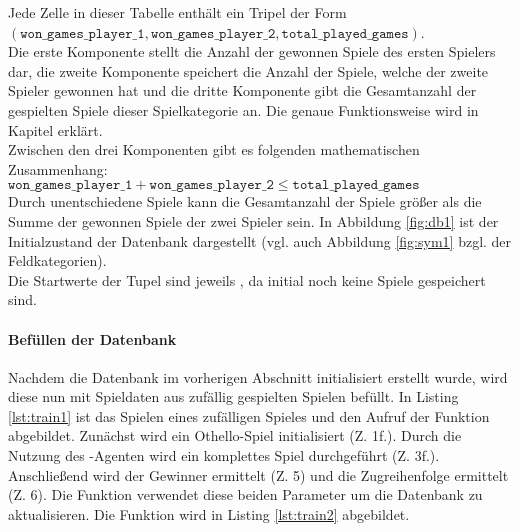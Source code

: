 Jede Zelle in dieser Tabelle enthält ein Tripel der Form \\$( \mathtt{won\_games\_player\_1}, \mathtt{won\_games\_player\_2}, \mathtt{total\_played\_games})$. 
\\Die erste Komponente stellt die Anzahl der gewonnen Spiele des ersten Spielers dar, die zweite Komponente speichert die Anzahl der Spiele, welche der zweite Spieler gewonnen hat und die dritte Komponente gibt die Gesamtanzahl der gespielten Spiele dieser Spielkategorie an. Die genaue Funktionsweise wird in Kapitel  erklärt.
\\Zwischen den drei Komponenten gibt es folgenden mathematischen Zusammenhang: 
\\$\mathtt{won\_games\_player\_1} + \mathtt{won\_games\_player\_2} \le \mathtt{total\_played\_games}$
\\Durch unentschiedene Spiele kann die Gesamtanzahl der Spiele größer als die Summe der gewonnen Spiele der zwei Spieler sein.
In Abbildung \ref{fig:db1} ist der Initialzustand der Datenbank dargestellt (vgl. auch Abbildung \ref{fig:sym1} bzgl. der Feldkategorien). 
\\
Die Startwerte der Tupel sind jeweils , da initial noch keine Spiele gespeichert sind.
\paragraph{Befüllen der Datenbank}
\label{para:train1}
Nachdem die Datenbank im vorherigen Abschnitt initialisiert erstellt wurde, wird diese nun mit Spieldaten aus zufällig gespielten Spielen befüllt. In Listing \ref{lst:train1} ist das Spielen eines zufälligen Spieles und den Aufruf der Funktion  abgebildet. Zunächst wird ein Othello-Spiel initialisiert (Z. 1f.). Durch die Nutzung des -Agenten wird ein komplettes Spiel durchgeführt (Z. 3f.). Anschließend wird der Gewinner ermittelt (Z. 5) und die Zugreihenfolge ermittelt (Z. 6). Die Funktion  verwendet diese beiden Parameter um die Datenbank zu aktualisieren. Die Funktion wird in Listing \ref{lst:train2} abgebildet.

